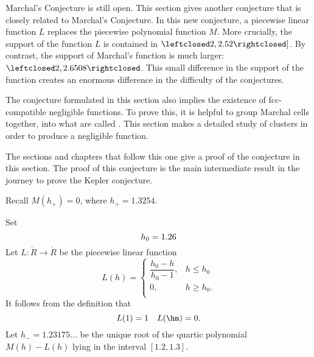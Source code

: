 \begin{summary} Marchal's Conjecture is still open.  This section
gives another conjecture that is closely related to Marchal's
Conjecture.  In this new conjecture, a piecewise linear function $L$
replaces the piecewise polynomial function $M$.  More crucially, the
support of the function $L$ is contained in
$\leftclosed2,2.52\rightclosed]$.  By contrast, the support of
Marchal's function is much larger:
$\leftclosed2,2.6508\rightclosed$.  This small difference in the
support of the function creates an enormous difference in the
difficulty of the conjectures.

The conjecture formulated in this section also implies the existence
of fcc-compatible negligible functions.  To prove this, it is
helpful to group Marchal cells together, into what are called
.  This section makes a detailed study of clusters
in order to produce a negligible function.

The sections and chapters that follow this one give a proof of the
conjecture in this section.  The proof of this conjecture is the
main intermediate result in the journey to prove the Kepler
conjecture.
\end{summary}

Recall $M(h_+) = 0$, where   $h_+ = 1.3254$.
%

\begin{definition}[$L$,~$h_0$,~$h_-$]\label{def:L}
Set
\begin{displaymath}
h_0 = 1.26\\  %
\end{displaymath}
Let $L:\ring{R}\to\ring{R}$ be the piecewise linear function 
\begin{displaymath}
L(h) = \begin{cases}
\dfrac{h_0-h}{h_0-1}, & h \le h_0 \\
0, & h\ge h_0. \\
\end{cases}
\end{displaymath}
It follows from the definition that
\begin{displaymath}
L(1) = 1\quad L(\hm) = 0.
\end{displaymath}
Let $h_- = 1.23175\ldots$ be the unique root of the quartic polynomial
$M(h)-L(h)$ lying in the interval $[1.2,1.3]$.
%
%
%
\end{definition}

